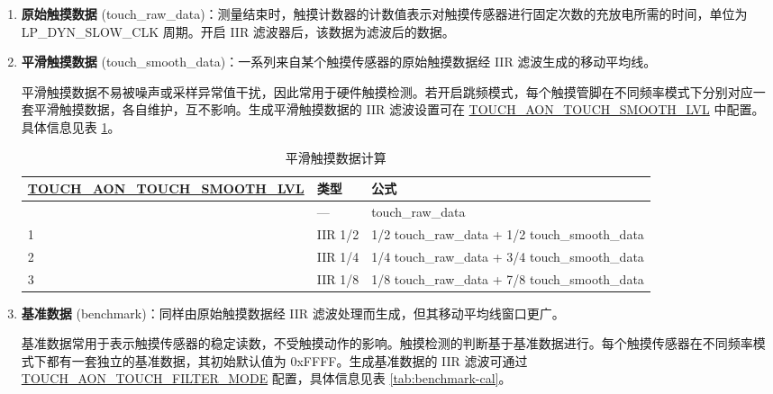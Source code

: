 \documentclass[main\_\_CN.tex]{subfiles}
\begin{document}
\begin{enumerate}
    \item \textbf{原始触摸数据} (touch\_raw\_data)：测量结束时，触摸计数器的计数值表示对触摸传感器进行固定次数的充放电所需的时间，单位为 LP\_DYN\_SLOW\_CLK 周期。开启 IIR 滤波器后，该数据为滤波后的数据。
    \item \textbf{平滑触摸数据} (touch\_smooth\_data)：一系列来自某个触摸传感器的原始触摸数据经 IIR 滤波生成的移动平均线。

    平滑触摸数据不易被噪声或采样异常值干扰，因此常用于硬件触摸检测。若开启跳频模式，每个触摸管脚在不同频率模式下分别对应一套平滑触摸数据，各自维护，互不影响。生成平滑触摸数据的 IIR 滤波设置可在 \hyperref[fielddesc:TOUCHAONTOUCHSMOOTHLVL]{TOUCH\_AON\_TOUCH\_SMOOTH\_LVL} 中配置。具体信息见表 \ref{tab:smooth-cal}。

    \begin{longtable}[c]{|p{5.5 cm}|p{1.5cm}|p{8.5cm}|}
        \caption{平滑触摸数据计算}
        \label{tab:smooth-cal}\\
        \hline
        \rowcolor{lightgray}
        \textbf{\hyperref[fielddesc:TOUCHAONTOUCHSMOOTHLVL]{TOUCH\_AON\_TOUCH\_SMOOTH\_LVL}} & \textbf{类型} & \textbf{公式}\\ 
        \hline
        \endhead
        \endfoot
        \endlastfoot
        0  & --- & touch\_raw\_data  \\\hline
        1  & IIR 1/2 & 1/2 touch\_raw\_data + 1/2 touch\_smooth\_data \\\hline
        2  & IIR 1/4 & 1/4 touch\_raw\_data + 3/4 touch\_smooth\_data \\\hline
        3  & IIR 1/8 & 1/8 touch\_raw\_data + 7/8 touch\_smooth\_data \\\hline
    \end{longtable}

    \item \textbf{基准数据} (benchmark)：同样由原始触摸数据经 IIR 滤波处理而生成，但其移动平均线窗口更广。
    
    基准数据常用于表示触摸传感器的稳定读数，不受触摸动作的影响。触摸检测的判断基于基准数据进行。每个触摸传感器在不同频率模式下都有一套独立的基准数据，其初始默认值为 0xFFFF。生成基准数据的 IIR 滤波可通过 \hyperref[fielddesc:TOUCHAONTOUCHFILTERMODE]{TOUCH\_AON\_TOUCH\_FILTER\_MODE} 配置，具体信息见表 \ref{tab:benchmark-cal}。


\end{enumerate}
\end{document}

